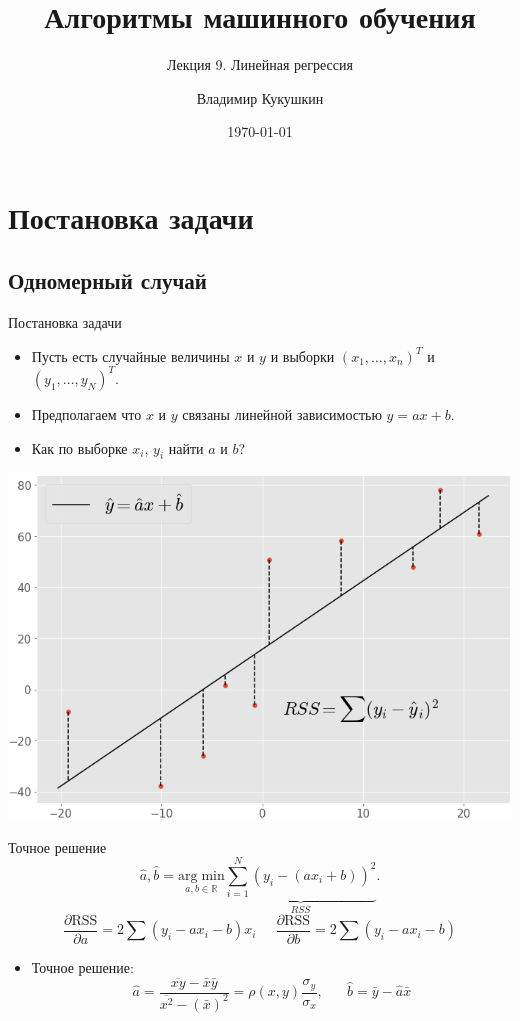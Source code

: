 \documentclass[9pt]{beamer}
\title{Алгоритмы машинного обучения}
\subtitle{Лекция 9. Линейная регрессия}
\author{Владимир Кукушкин}
\institute{СПбГЭУ - 2020}
\date{\today}
\begin{document}
\titlepage

\section{Постановка задачи}
\subsection{Одномерный случай}

\begin{frame}{Постановка задачи}
\begin{itemize}
    \item Пусть есть случайные величины $x$ и $y$ и выборки $(x_1, \ldots, x_n)^T$ и $(y_1, \ldots, y_N)^T$. 
    \item Предполагаем что $x$ и $y$ связаны линейной зависимостью $y=ax+b$.
    \item Как по выборке $x_i$, $y_i$ найти $a$ и $b$?
\end{itemize}
\begin{center}
    \includegraphics[height=0.5\textheight]{img/linear_regression_2d.png}
\end{center}
\end{frame}

\begin{frame}{Точное решение}
    $$\hat a, \hat b = \underset{a, b\in \mathbb{R}}{\mathrm{arg\;min}}\underbrace{\sum_{i=1}^N (y_i - (ax_i + b))^2}_{RSS}.$$
    $$\frac{\partial \text{RSS}}{\partial a} = 2\sum (y_i - ax_i - b)x_i\;\;\;\;\;\frac{\partial \text{RSS}}{\partial b} = 2\sum (y_i - ax_i - b)$$
\begin{itemize}
    \item Точное решение:
    $$\hat a = \frac{\overline{xy} - \bar x\bar y}{\overline{x^2} - (\bar x)^2} = \rho(x, y)\frac{\sigma_y}{\sigma_x} , \;\;\;\;\;\; \hat b = \bar y - \hat a \bar x$$
\end{itemize}
\end{frame}
\end{document}
